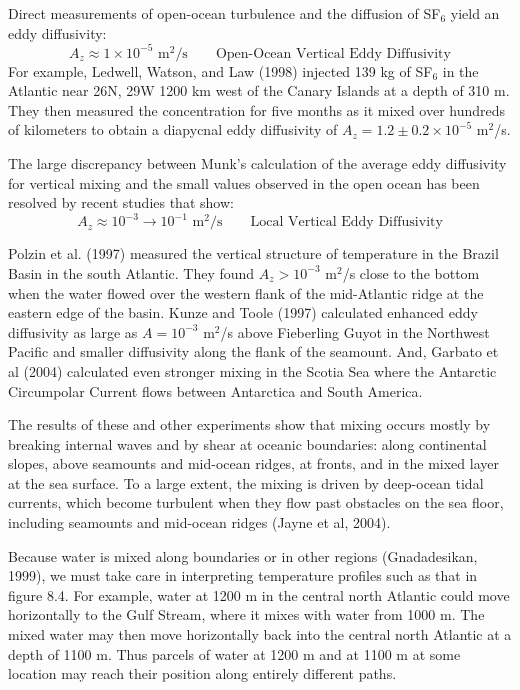 Direct measurements of open-ocean turbulence and the diffusion
of SF$_6$ yield an eddy diffusivity:
\begin{equation}
A_z \approx 1 \times 10^{-5} \text{ m$^2$/s} \qquad \text{Open-Ocean Vertical
Eddy Diffusivity}
\end{equation}
For example, Ledwell, Watson, and Law (1998) injected 139 kg of SF$_6$ in the Atlantic near 26\degrees N, 29\degrees W 1200 km west of the Canary Islands at a depth of 310 m. They then measured the concentration for five months as it mixed over hundreds of kilometers to obtain a diapycnal eddy diffusivity of $A_z = 1.2 \pm 0.2 \times 10^{-5}$ m$^2$/s. 

The large discrepancy between Munk's calculation of the average eddy diffusivity for vertical mixing and the small values observed in the open ocean has been resolved by recent studies that show:
\begin{equation}
A_z \approx 10^{-3} \to 10^{-1} \text{ m$^2$/s} \qquad \text{Local Vertical Eddy Diffusivity}
\end{equation}

Polzin et al. (1997) measured the vertical structure of temperature in the Brazil Basin in the south Atlantic. They found $A_z > 10^{-3}$ m$^2$/s close to the bottom when the water flowed over the western flank of the mid-Atlantic ridge at the eastern edge of the basin. Kunze and Toole (1997) calculated enhanced eddy diffusivity as large as $A= 10^{-3}$ m$^2$/s above Fieberling Guyot in the Northwest Pacific and smaller diffusivity along the flank of the seamount. And, Garbato et al (2004) calculated even stronger mixing in the Scotia Sea where the Antarctic Circumpolar Current flows between Antarctica and South America.

The results of these and other experiments show that mixing occurs mostly by breaking internal waves and by shear at oceanic boundaries: along continental slopes, above seamounts and mid-ocean ridges, at fronts, and in the mixed layer at the sea surface. To a large extent, the mixing is driven by deep-ocean tidal currents, which become turbulent when they flow past obstacles on the sea floor, including seamounts and mid-ocean ridges (Jayne et al, 2004).

Because water is mixed along boundaries or in other regions (Gnadadesikan, 1999), we must take care in interpreting temperature profiles such as that in figure 8.4. For example, water at 1200 m in the
central north Atlantic could move horizontally to the Gulf Stream, where it mixes with water from 1000 m. The mixed water may then move horizontally back into the central north Atlantic at a depth of 1100 m. Thus parcels of water at 1200 m and at 1100 m at some location may reach their position along entirely different paths.

